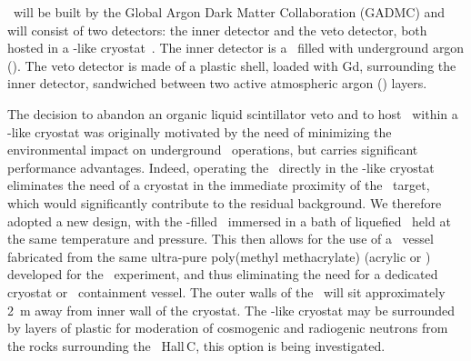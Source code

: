 \DSks\ will be built by the Global Argon Dark Matter Collaboration (GADMC) and will consist of two detectors: the inner detector and the veto detector, both hosted in a \pDUNE-like cryostat~\cite{Abi:2017wp,Acciarri:2016wz}.   The inner detector is a \LArTPC\ filled with underground argon (\UAr).  The veto detector is made of a plastic shell, loaded with Gd, surrounding the inner detector, sandwiched between two active atmospheric argon (\AAr) layers.  


The decision to abandon an organic liquid scintillator veto and to host \DSks\ within a \pDUNE-like cryostat was originally motivated by the need of minimizing the environmental impact on underground \LNGS\ operations, but carries significant performance advantages.  Indeed, operating the \TPC\ directly in the \pDUNE-like cryostat eliminates the need of a cryostat in the immediate proximity of the \UAr\ target, which would significantly contribute to the residual background.  We therefore adopted a new design, with the \UAr-filled \TPC\  immersed in a bath of liquefied \AAr\ held at the same temperature and pressure.  This then allows for the use of a \TPC\ vessel fabricated from the same ultra-pure poly(methyl methacrylate) (acrylic or \PMMA) developed for the \DEAP\ experiment, and thus eliminating the need for a dedicated cryostat or \UAr\ containment vessel.  The outer walls of the \TPC\ will sit approximately \SI{2}{\m} away from inner wall of the cryostat.  The \pDUNE-like cryostat may be surrounded by layers of plastic for moderation of cosmogenic and radiogenic neutrons from the rocks surrounding the \LNGS\ Hall\,C, this option is being investigated.

